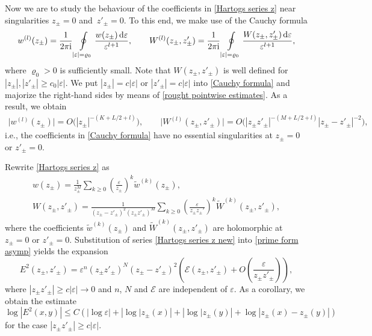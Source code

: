 \documentclass[pdftex]{sigma}
\numberwithin{equation}{section}
\theoremstyle{definition}
\begin{document}
Now we are to study the behaviour of the coefficients in \eqref{Hartogs series z} near singularities $z_\pm=0$ and~${z'_\pm=0}$. To this end, we make use of the Cauchy formula
\begin{equation}
\label{Cauchy formula}
w^{(l)}(z_\pm)=\frac{1}{2\pi {\rm i} }\oint\limits_{|\varepsilon|=\varrho_0}\frac{w(z_\pm)\,{\rm d}\varepsilon}{\varepsilon^{l+1}}, \qquad W^{(l)}(z_\pm,z'_\pm)=\frac{1}{2\pi {\rm i} }\oint\limits_{|\varepsilon|=\varrho_0}\frac{W(z_\pm,z'_\pm)\,{\rm d}\varepsilon}{\varepsilon^{l+1}},
\end{equation}
where $\varrho_0>0$ is sufficiently small. Note that $W(z_\pm,z'_\pm)$ is well defined for $|z_\pm|,|z'_\pm|\ge c_0|\varepsilon|$. We put $|z_\pm|=c|\varepsilon|$ or $|z'_\pm|=c|\varepsilon|$ into \eqref{Cauchy formula} and majorize the right-hand sides by means of \eqref{rought pointwise estimates}. As a result, we obtain
\begin{gather*}
\bigl|w^{(l)}(z_\pm)\bigr|=O\bigl(|z_\pm|^{-(K+L/2+l)}\bigr),\qquad
\bigl|W^{(l)}(z_\pm,z'_\pm)\bigr|=O\bigl(|z_\pm z'_\pm|^{-(M+L/2+l)}|z_\pm-z'_\pm|^{-2}\bigr),
\end{gather*}
i.e., the coefficients in \eqref{Cauchy formula} have no essential singularities at $z_\pm=0$ or $z'_\pm=0$.

Rewrite \eqref{Hartogs series z} as
\begin{gather}
w(z_\pm)=\frac{1}{z_\pm^{M}}\sum_{k\ge 0}\left(\frac{\varepsilon}{z_\pm}\right)^{k}\tilde{w}^{(k)}(z_\pm), \nonumber\\
W(z_\pm,z'_\pm)=\frac{1}{(z_\pm-z'_\pm)^{2}(z_\pm z'_\pm)^{M}}\sum_{k\ge 0}\left(\frac{\varepsilon}{z_\pm z_\pm'}\right)^{k}\tilde{W}^{(k)}(z_\pm,z'_\pm),\label{Hartogs series z new}
\end{gather}
where the coefficients $\tilde{w}^{(k)}(z_\pm)$ and $\tilde{W}^{(k)}(z_\pm,z'_\pm)$ are holomorphic at $z_\pm=0$ or $z'_\pm=0$. Substitution of series \eqref{Hartogs series z new} into \eqref{prime form asymp} yields the expansion
\[E^{2}(z_\pm,z'_\pm)=\varepsilon^n(z_\pm z'_\pm)^N(z_\pm-z'_\pm)^2\left(\mathscr{E}(z_\pm,z'_\pm)+O\left(\frac{\varepsilon}{z_\pm z'_\pm}\right)\right),\]
where $|z_\pm z'_\pm|\ge c|\varepsilon|\to 0$ and $n$, $N$ and $\mathscr{E}$ are independent of $\varepsilon$. As a corollary, we obtain the estimate
\begin{equation}
\label{prime form estimate 2}
\log |E^2(x,y)|\le C\left(|{\log \varepsilon}|+|{\log |z_\pm(x)}|+|{\log |z_\pm(y)}|+\log |z_\pm(x)-z_\pm(y)|\right)
\end{equation}
for the case $|z_\pm z'_\pm|\ge c|\varepsilon|$.
\end{document}
